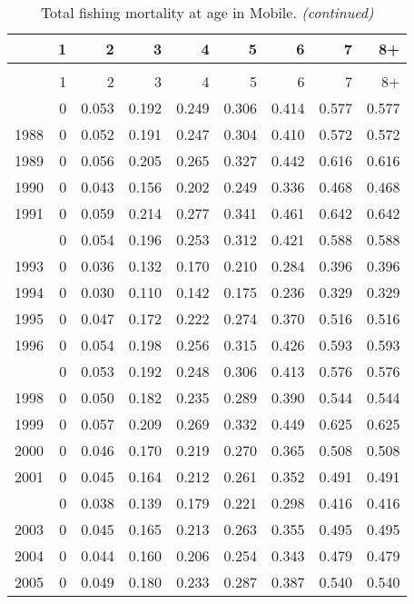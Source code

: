 \documentclass[
]{article}
\begin{document}
\begin{longtable}[t]{lrrrrrrrr}
\caption{\label{tab:Mobile-fleet-FAA-table}Total fishing mortality at age in Mobile.}\\
\toprule
  & 1 & 2 & 3 & 4 & 5 & 6 & 7 & 8+\\
\midrule
\endfirsthead
\caption[]{Total fishing mortality at age in Mobile. \textit{(continued)}}\\
\toprule
  & 1 & 2 & 3 & 4 & 5 & 6 & 7 & 8+\\
\midrule
\endhead

\endfoot
\bottomrule
\endlastfoot
1987 & 0 & 0.053 & 0.192 & 0.249 & 0.306 & 0.414 & 0.577 & 0.577\\
1988 & 0 & 0.052 & 0.191 & 0.247 & 0.304 & 0.410 & 0.572 & 0.572\\
1989 & 0 & 0.056 & 0.205 & 0.265 & 0.327 & 0.442 & 0.616 & 0.616\\
1990 & 0 & 0.043 & 0.156 & 0.202 & 0.249 & 0.336 & 0.468 & 0.468\\
1991 & 0 & 0.059 & 0.214 & 0.277 & 0.341 & 0.461 & 0.642 & 0.642\\
\addlinespace
1992 & 0 & 0.054 & 0.196 & 0.253 & 0.312 & 0.421 & 0.588 & 0.588\\
1993 & 0 & 0.036 & 0.132 & 0.170 & 0.210 & 0.284 & 0.396 & 0.396\\
1994 & 0 & 0.030 & 0.110 & 0.142 & 0.175 & 0.236 & 0.329 & 0.329\\
1995 & 0 & 0.047 & 0.172 & 0.222 & 0.274 & 0.370 & 0.516 & 0.516\\
1996 & 0 & 0.054 & 0.198 & 0.256 & 0.315 & 0.426 & 0.593 & 0.593\\
\addlinespace
1997 & 0 & 0.053 & 0.192 & 0.248 & 0.306 & 0.413 & 0.576 & 0.576\\
1998 & 0 & 0.050 & 0.182 & 0.235 & 0.289 & 0.390 & 0.544 & 0.544\\
1999 & 0 & 0.057 & 0.209 & 0.269 & 0.332 & 0.449 & 0.625 & 0.625\\
2000 & 0 & 0.046 & 0.170 & 0.219 & 0.270 & 0.365 & 0.508 & 0.508\\
2001 & 0 & 0.045 & 0.164 & 0.212 & 0.261 & 0.352 & 0.491 & 0.491\\
\addlinespace
2002 & 0 & 0.038 & 0.139 & 0.179 & 0.221 & 0.298 & 0.416 & 0.416\\
2003 & 0 & 0.045 & 0.165 & 0.213 & 0.263 & 0.355 & 0.495 & 0.495\\
2004 & 0 & 0.044 & 0.160 & 0.206 & 0.254 & 0.343 & 0.479 & 0.479\\
2005 & 0 & 0.049 & 0.180 & 0.233 & 0.287 & 0.387 & 0.540 & 0.540\\

\end{longtable}
\end{document}
